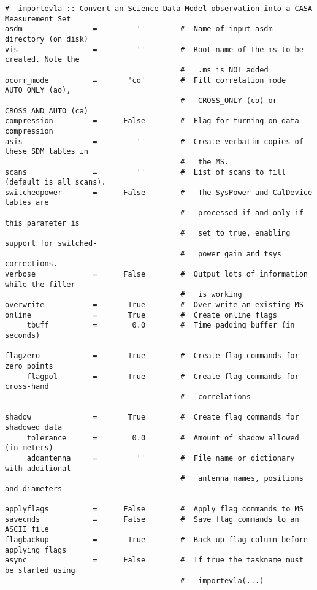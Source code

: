 \small
\begin{verbatim}
#  importevla :: Convert an Science Data Model observation into a CASA Measurement Set
asdm                =         ''        #  Name of input asdm directory (on disk)
vis                 =         ''        #  Root name of the ms to be created. Note the
                                        #   .ms is NOT added
ocorr_mode          =       'co'        #  Fill correlation mode AUTO_ONLY (ao),
                                        #   CROSS_ONLY (co) or CROSS_AND_AUTO (ca)
compression         =      False        #  Flag for turning on data compression
asis                =         ''        #  Create verbatim copies of these SDM tables in
                                        #   the MS.
scans               =         ''        #  List of scans to fill (default is all scans).
switchedpower       =      False        #   The SysPower and CalDevice tables are
                                        #   processed if and only if this parameter is
                                        #   set to true, enabling support for switched-
                                        #   power gain and tsys corrections.
verbose             =      False        #  Output lots of information while the filler
                                        #   is working
overwrite           =       True        #  Over write an existing MS
online              =       True        #  Create online flags
     tbuff          =        0.0        #  Time padding buffer (in seconds)

flagzero            =       True        #  Create flag commands for zero points
     flagpol        =       True        #  Create flag commands for cross-hand
                                        #   correlations

shadow              =       True        #  Create flag commands for shadowed data
     tolerance      =        0.0        #  Amount of shadow allowed (in meters)
     addantenna     =         ''        #  File name or dictionary with additional
                                        #   antenna names, positions and diameters

applyflags          =      False        #  Apply flag commands to MS
savecmds            =      False        #  Save flag commands to an ASCII file
flagbackup          =       True        #  Back up flag column before applying flags
async               =      False        #  If true the taskname must be started using
                                        #   importevla(...)
\end{verbatim}
\normalsize

